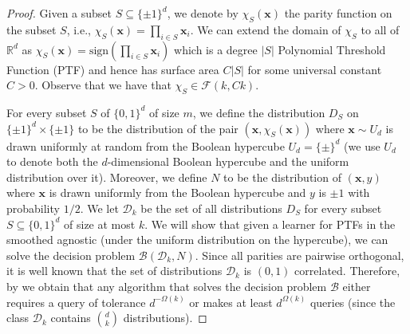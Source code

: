 \documentclass[10pt,a4paper]{article}
\renewcommand\vec[1]{\mathbf{#1}}
\newcommand{\R}{\mathbb{R}}
\newcommand{\sign}{\mathrm{sign}}
\newcommand{\1}{\Ind}
\newcommand{\x}{\vec x}
\newcommand{\F}{\mathcal{F}}
\begin{document}
\begin{proof}


Given a subset $S \subseteq \{\pm 1\}^d$,  we denote by $\chi_S(\x)$ the parity function on the subset $S$, i.e.,
$\chi_S(\x) = \prod_{i\in S}\x_{i}$. We can extend the domain of $\chi_S$ to all of $\R^{d}$ as  $\chi_S(\x)=\sign(\prod_{i\in S}\x_{i})$ which is a degree $|S|$ Polynomial Threshold Function (PTF) and hence has surface area $C|S|$ for some universal constant $C>0$. Observe that we have that $\chi_S\in \F(k,Ck)$.

For every subset $S$ of $\{0, 1\}^d$ of size $m$, we define the distribution $D_S$ 
on $\{\pm 1\}^d \times \{\pm 1\}$ to be the distribution
of the pair $(\x, \chi_S(\x))$ where $\x \sim U_d$ is drawn uniformly at random from the Boolean hypercube $U_d = \{\pm\}^d$ (we use $U_d$ to denote both the $d$-dimensional Boolean hypercube and the uniform distribution over it).
Moreover, we define $N$ to be the distribution of $(\x, y)$
where $\x$ is drawn uniformly from the Boolean hypercube
and $y$ is $\pm 1$ with probability $1/2$. 
We let $\mathcal{D}_k$ be the set of all distributions $D_S$
for every subset $S \subseteq \{0, 1\}^d$ of size at most $k$. 
We will show that given a learner for PTFs in the smoothed agnostic
 (under the uniform distribution on the hypercube), we can solve the decision problem $\mathcal{B}(\mathcal D_k, N)$.  
Since all parities are pairwise orthogonal, it is well known that the set of distributions $\mathcal D_k$ is $(0,1)$ correlated.  Therefore, by  we obtain that any algorithm that solves 
the decision problem $\mathcal{B}$ either requires 
a query of tolerance $d^{-\Omega(k)}$ or makes at least
$d^{\Omega(k)}$ queries (since the class $\mathcal D_k$
contains $\binom{d}{k}$ distributions).


\end{proof}
\end{document}
